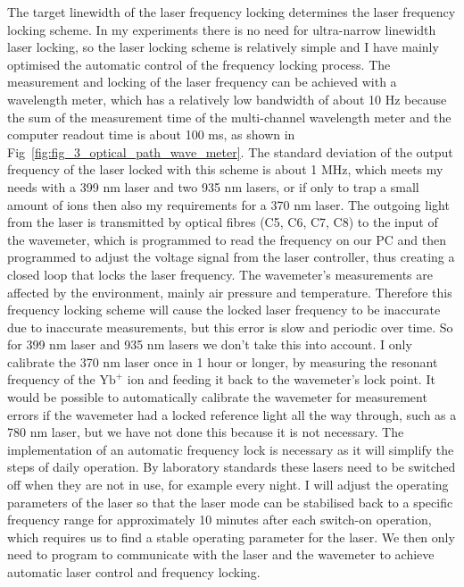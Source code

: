 The target linewidth of the laser frequency locking determines the laser frequency locking scheme. In my experiments there is no need for ultra-narrow linewidth laser locking, so the laser locking scheme is relatively simple and I have mainly optimised the automatic control of the frequency locking process. The measurement and locking of the laser frequency can be achieved with a wavelength meter, which has a relatively low bandwidth of about 10 Hz because the sum of the measurement time of the multi-channel wavelength meter and the computer readout time is about 100 ms, as shown in Fig~\ref{fig:fig_3_optical_path_wave_meter}. The standard deviation of the output frequency of the laser locked with this scheme is about 1 MHz, which meets my needs with a 399 nm laser and two 935 nm lasers, or if only to trap a small amount of ions then also my requirements for a 370 nm laser. The outgoing light from the laser is transmitted by optical fibres (C5, C6, C7, C8) to the input of the wavemeter, which is programmed to read the frequency on our PC and then programmed to adjust the voltage signal from the laser controller, thus creating a closed loop that locks the laser frequency. The wavemeter's measurements are affected by the environment, mainly air pressure and temperature. Therefore this frequency locking scheme will cause the locked laser frequency to be inaccurate due to inaccurate measurements, but this error is slow and periodic over time. So for 399 nm laser and 935 nm lasers we don't take this into account. I only calibrate the 370 nm laser once in 1 hour or longer, by measuring the resonant frequency of the $\mathrm{Yb}^{+}$ ion and feeding it back to the wavemeter's lock point. It would be possible to automatically calibrate the wavemeter for measurement errors if the wavemeter had a locked reference light all the way through, such as a 780 nm laser, but we have not done this because it is not necessary. The implementation of an automatic frequency lock is necessary as it will simplify the steps of daily operation. By laboratory standards these lasers need to be switched off when they are not in use, for example every night. I will adjust the operating parameters of the laser so that the laser mode can be stabilised back to a specific frequency range for approximately 10 minutes after each switch-on operation, which requires us to find a stable operating parameter for the laser. We then only need to program to communicate with the laser and the wavemeter to achieve automatic laser control and frequency locking.


